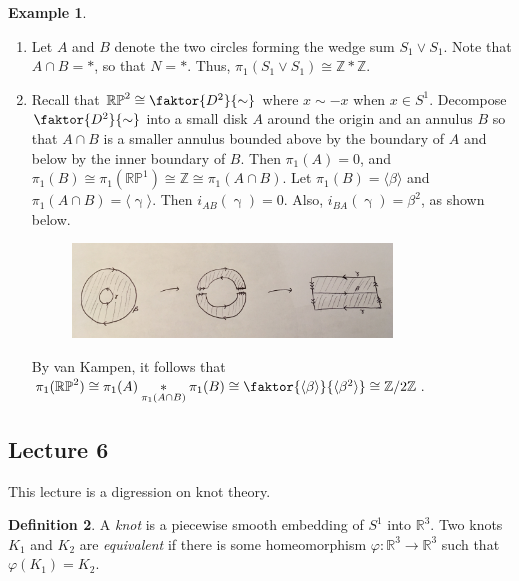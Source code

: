 \documentclass[10pt,letterpaper,cm]{nupset}
\theoremstyle{definition}
\newtheorem{definition}{Definition}[subsection]
\newtheorem{exmp}[definition]{Example}
\theoremstyle{theorem}
\theoremstyle{remark}
\newcommand{\R}{\mathbb{R}}
\newcommand{\RP}{\mathbb{RP}}
\newcommand{\Z}{\mathbb Z}
\newcommand{\1}{\mathbb{1}}
\newcommand{\0}{\vec 0}
\begin{document}
\begin{exmp} $ $
\begin{enumerate}
\item  Let $A$ and $B$ denote the two circles forming the wedge sum $S_1 \vee S_1$.  Note that $A\cap B = \ast$, so that $N=\ast$. Thus, $\pi_1(S_1 \vee S_1) \cong \Z \ast \Z$.
\item Recall that $\RP^2 \cong \faktor{D^2}{\sim}$ where $x\sim -x$ when $x\in S^1$. Decompose $\faktor{D^2}{\sim}$ into a small disk $A$ around the origin and an annulus $B$ so that $A \cap B$ is a smaller annulus bounded above by the boundary of $A$ and below by the inner boundary of $B$. Then $\pi_1(A) =0$, and $\pi_1(B) \cong \pi_1(\RP^1) \cong  \Z \cong \pi_1(A \cap B)$. Let $\pi_1(B) = \langle \beta \rangle$ and $\pi_1(A \cap B) = \langle \upgamma \rangle$. Then $i_{AB}(\upgamma) =0$. Also, $i_{BA}(\upgamma) = \beta^2$, as shown below.
\begin{figure}[H]
\centering
\includegraphics[width=85mm]{RP2.jpg}
\end{figure}
By van Kampen, it follows that $\pi_1(\RP^2) \cong \pi_1(A) \underset{\pi_1(A \cap B)}{\ast} \pi_1(B) \cong \faktor{\langle \beta \rangle}{\langle \beta^2 \rangle} \cong \Z / 2 \Z$.
\end{enumerate}
\end{exmp}



\subsection{Lecture 6}

This lecture is a digression on knot theory.

\begin{definition}
A \textit{knot} is a piecewise smooth embedding of $S^1$ into $\R^3$. Two knots $K_1$ and $K_2$ are \textit{equivalent} if there is some homeomorphism $\varphi : \R^3 \to \R^3$ such that $\varphi(K_1) = K_2$.
\end{definition}
\end{document}
